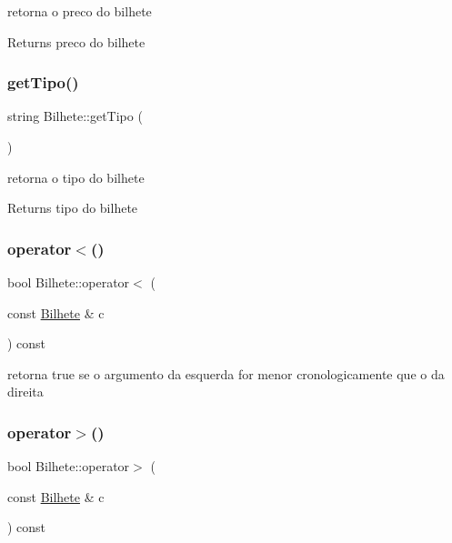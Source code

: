 retorna o preco do bilhete \begin{DoxyReturn}{Returns}
preco do bilhete 
\end{DoxyReturn}
\mbox{\label{class_bilhete_a454736f9880f0ee44e53cca1e894df7d}} 
\subsubsection{\texorpdfstring{get\+Tipo()}{getTipo()}}
{\footnotesize\ttfamily string Bilhete\+::get\+Tipo (\begin{DoxyParamCaption}{ }\end{DoxyParamCaption})}

retorna o tipo do bilhete \begin{DoxyReturn}{Returns}
tipo do bilhete 
\end{DoxyReturn}
\mbox{\label{class_bilhete_a09be5c8b845201431c4e96cc6e441f11}} 
\subsubsection{\texorpdfstring{operator$<$()}{operator<()}}
{\footnotesize\ttfamily bool Bilhete\+::operator$<$ (\begin{DoxyParamCaption}\item[{const \mbox{\hyperlink{class_bilhete}{Bilhete}} \&}]{c }\end{DoxyParamCaption}) const}

retorna true se o argumento da esquerda for menor cronologicamente que o da direita \mbox{\label{class_bilhete_a3fb340596c0ab30945a1de6b691c842b}} 
\subsubsection{\texorpdfstring{operator$>$()}{operator>()}}
{\footnotesize\ttfamily bool Bilhete\+::operator$>$ (\begin{DoxyParamCaption}\item[{const \mbox{\hyperlink{class_bilhete}{Bilhete}} \&}]{c }\end{DoxyParamCaption}) const}

